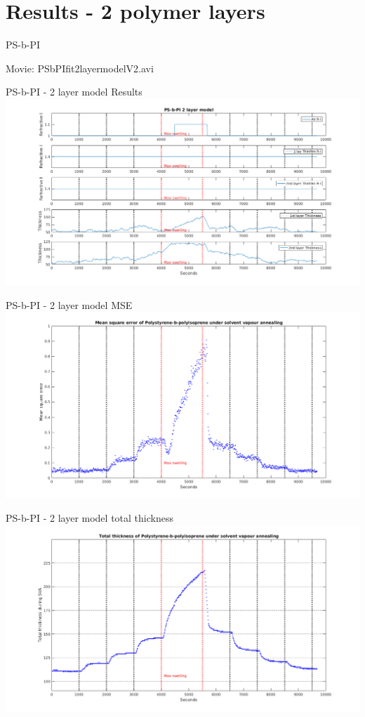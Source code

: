 \documentclass[10pt]{beamer}
\begin{document}
	\section{Results - 2 polymer layers}
	
\begin{frame}{PS-b-PI}
\begin{center}
	\huge Movie: PSbPIfit2layermodelV2.avi
\end{center}
\end{frame}

\begin{frame}{PS-b-PI - 2 layer model Results}
\centering
\includegraphics[width=\textwidth]{Results_2layer_PSbPI.png}
\end{frame}

\begin{frame}{PS-b-PI - 2 layer model MSE}
\centering
\includegraphics[width=\textwidth]{MSE_2layer_PSbPI.png}
\end{frame}

\begin{frame}{PS-b-PI - 2 layer model total thickness}
\centering
\includegraphics[width=\textwidth]{total_thickness_2layer_PSbPI.png}
\end{frame}
\end{document}
